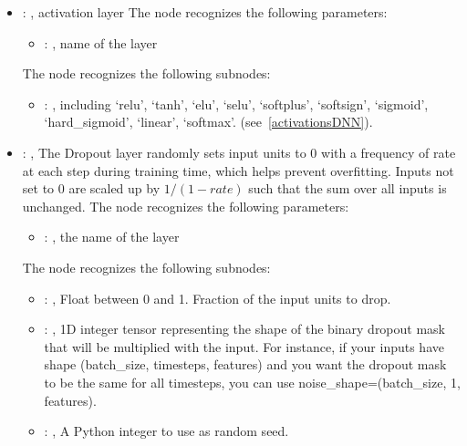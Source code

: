 \begin{itemize}
    \item {}: , 
      activation layer
      The  node recognizes the following parameters:
        \begin{itemize}
          \item {}: , 
            name of the layer
      \end{itemize}

      The  node recognizes the following subnodes:
      \begin{itemize}
        \item {}: , 
          including {`relu', `tanh', `elu', `selu', `softplus', `softsign', `sigmoid',
          `hard\_sigmoid', `linear', `softmax'}.         (see~\ref{activationsDNN}).
      \end{itemize}

    \item {}: , 
      The Dropout layer randomly sets input units to 0 with a frequency of rate at each step during
      training time, which helps prevent overfitting. Inputs not set to 0 are scaled up by $1/(1 -
      rate)$         such that the sum over all inputs is unchanged.
      The  node recognizes the following parameters:
        \begin{itemize}
          \item {}: , 
            the name of the layer
      \end{itemize}

      The  node recognizes the following subnodes:
      \begin{itemize}
        \item {}: , 
          Float between 0 and 1. Fraction of the input units to drop.

        \item {}: , 
          1D integer tensor representing the shape of the binary dropout mask that will be
          multiplied with         the input. For instance, if your inputs have shape (batch\_size,
          timesteps, features) and you want the         dropout mask to be the same for all
          timesteps, you can use noise\_shape=(batch\_size, 1, features).

        \item {}: , 
          A Python integer to use as random seed.
      \end{itemize}


\end{itemize}
